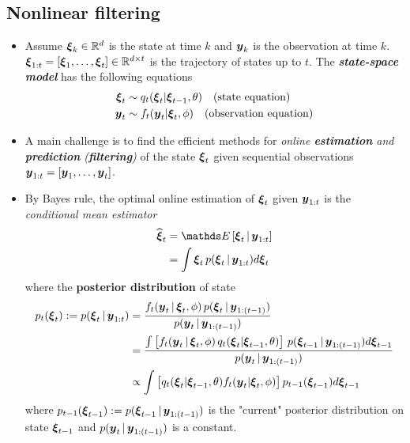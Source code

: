 \documentclass[11pt]{article}
\begin{document}
\subsection{Nonlinear filtering}
\begin{itemize}
\item Assume $\boldsymbol{\xi}_{k} \in {\mathbb R}^{d}$ is the state at time $k$ and $\boldsymbol{y}_{k}$ is the observation at time $k$. $\boldsymbol{\xi}_{1:t} = [\boldsymbol{\xi}_1, \ldots, \boldsymbol{\xi}_{t}] \in {\mathbb R}^{d \times t}$ is the trajectory of states up to $t$. The \emph{\textbf{state-space model}} has the following equations
\begin{align*}
\boldsymbol{\xi}_{t} &\sim q_{t}(\boldsymbol{\xi}_{t} | \boldsymbol{\xi}_{t-1}, \theta) \quad (\text{state equation})\\
\boldsymbol{y}_{t} &\sim f_{t}(\boldsymbol{y}_t | \boldsymbol{\xi}_{t}, \phi) \quad (\text{observation equation})
\end{align*}

\item A main challenge is to find the efficient methods for \emph{online \textbf{estimation} and \textbf{prediction} (\textbf{filtering})} of the state $\boldsymbol{\xi}_{t}$ given sequential observations $\boldsymbol{y}_{1:t} = [\boldsymbol{y}_1, \ldots, \boldsymbol{y}_t]$.

\item By Bayes rule, the optimal online estimation of $\boldsymbol{\xi}_{t}$ given $\boldsymbol{y}_{1:t}$ is the \emph{conditional mean estimator}
\begin{align}
\widehat{\mb{\xi}}_{t} &= \E{}{\mb{\xi}_{t} \,|\, \mb{y}_{1:t}} \label{eqn: particle_filter_cond_mean}\\
&= \int \mb{\xi}_{t} \,p(\mb{\xi}_{t}\,|\,\mb{y}_{1:t}) d\mb{\xi}_{t} \nonumber
\end{align} where the \textbf{posterior distribution} of state
\begin{align}
p_t(\boldsymbol{\xi}_{t}) := p(\boldsymbol{\xi}_{t}\,|\,\boldsymbol{y}_{1:t}) &= \frac{f_t(\boldsymbol{y}_{t}\,|\,\boldsymbol{\xi}_{t}, \phi)\,p(\boldsymbol{\xi}_{t}\,|\,\boldsymbol{y}_{1:(t-1)})}{p(\boldsymbol{y}_{t}\,|\,\boldsymbol{y}_{1:(t-1)})}\nonumber\\
&= \frac{\int \left[f_t(\boldsymbol{y}_{t}\,|\,\boldsymbol{\xi}_{t}, \phi)\,q_{t}(\boldsymbol{\xi}_{t} | \boldsymbol{\xi}_{t-1}, \theta)\right]\,p(\boldsymbol{\xi}_{t-1}\,|\,\boldsymbol{y}_{1:(t-1)})d\boldsymbol{\xi}_{t-1}}{p(\boldsymbol{y}_{t}\,|\,\boldsymbol{y}_{1:(t-1)})} \nonumber\\
&\propto \int \left[q_{t}(\boldsymbol{\xi}_{t} | \boldsymbol{\xi}_{t-1}, \theta) f_{t}(\boldsymbol{y}_t | \boldsymbol{\xi}_{t}, \phi)\right] p_{t-1}(\boldsymbol{\xi}_{t-1}) d\boldsymbol{\xi}_{t-1} \label{eqn: particle_filter_posterior_update}
\end{align} where $p_{t-1}(\boldsymbol{\xi}_{t-1}) := p(\boldsymbol{\xi}_{t-1}\,|\,\boldsymbol{y}_{1:(t-1)})$ is the "current" posterior distribution on state $\boldsymbol{\xi}_{t-1}$ and $p(\boldsymbol{y}_{t}\,|\,\boldsymbol{y}_{1:(t-1)})$ is a constant.


\end{itemize}
\end{document}
